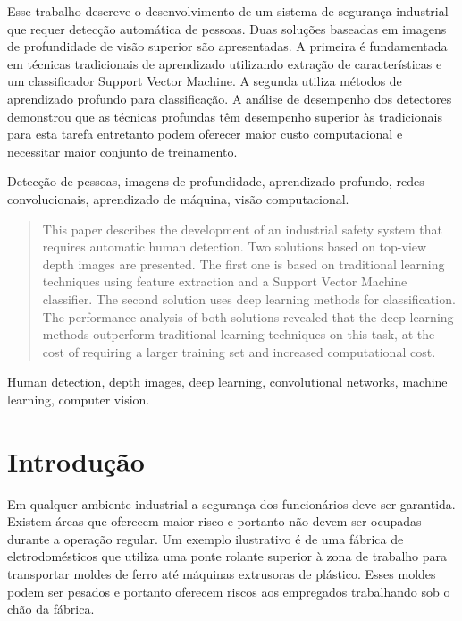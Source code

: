 
\begin{resumo}
Esse trabalho descreve o desenvolvimento de um sistema de segurança industrial que requer detecção automática de pessoas. Duas soluções baseadas em imagens de profundidade de visão superior são apresentadas. A primeira é fundamentada em técnicas tradicionais de aprendizado utilizando extração de características e um classificador Support Vector Machine. A segunda utiliza métodos de aprendizado profundo para classificação. A análise de desempenho dos detectores demonstrou que as técnicas profundas têm desempenho superior às tradicionais para esta tarefa entretanto podem oferecer maior custo computacional e necessitar maior conjunto de treinamento.
\end{resumo}

\begin{chave}
Detecção de pessoas, imagens de profundidade, aprendizado profundo, redes convolucionais, aprendizado de máquina, visão computacional.
\end{chave}

\begin{abstract}
This paper describes the development of an industrial safety system that requires automatic human detection. Two solutions based on top-view depth images are presented. The first one is based on traditional learning techniques using feature extraction and a Support Vector Machine classifier. The second solution uses deep learning methods for classification. The performance analysis of both solutions revealed that the deep learning methods outperform traditional learning techniques on this task, at the cost of requiring a larger training set and increased computational cost.
\end{abstract}

\begin{keywords}
  Human detection, depth images, deep learning, convolutional networks, machine learning, computer vision.
\end{keywords}

\section{Introdução}
  Em qualquer ambiente industrial a segurança dos funcionários deve ser garantida. Existem áreas que oferecem maior risco e portanto não devem ser ocupadas durante a operação regular. Um exemplo ilustrativo é de uma fábrica de eletrodomésticos que utiliza uma ponte rolante superior à zona de trabalho para transportar moldes de ferro até máquinas extrusoras de plástico. Esses moldes podem ser pesados e portanto oferecem riscos aos empregados trabalhando sob o chão da fábrica.

